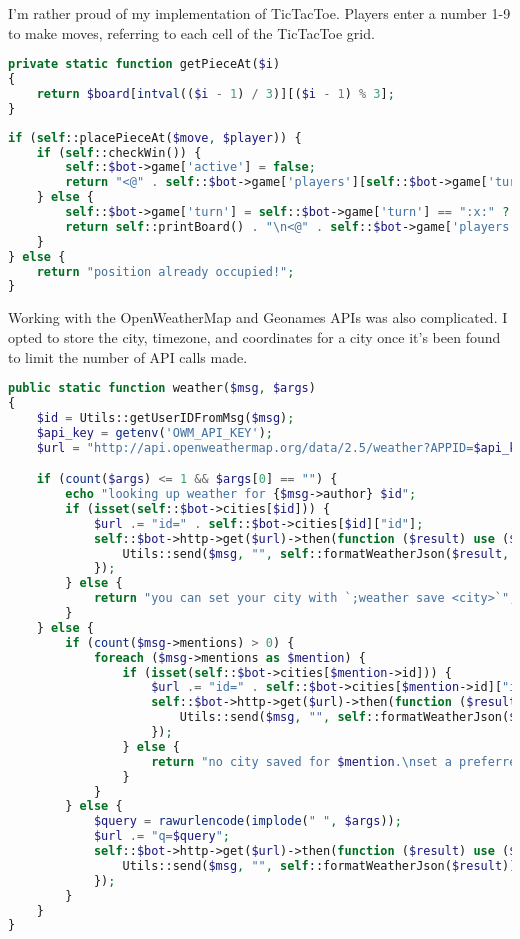 \documentclass[12pt]{article} %
\begin{document}
I'm rather proud of my implementation of TicTacToe. Players enter a number 1-9 to make moves, referring to each cell of the TicTacToe grid.


\begin{lstlisting}[language=PHP, caption=Get TicTacToe cell value]
private static function getPieceAt($i)
{
    return $board[intval(($i - 1) / 3)][($i - 1) % 3];
}
\end{lstlisting}

\begin{lstlisting}[language=PHP, caption=Handle a move from a player]
if (self::placePieceAt($move, $player)) {
    if (self::checkWin()) {
        self::$bot->game['active'] = false;
        return "<@" . self::$bot->game['players'][self::$bot->game['turn']] . "> won";
    } else {
        self::$bot->game['turn'] = self::$bot->game['turn'] == ":x:" ? ":o:" : ":x:";
        return self::printBoard() . "\n<@" . self::$bot->game['players'][self::$bot->game['turn']] . ">, it's your turn!";
    }
} else {
    return "position already occupied!";
}
\end{lstlisting}

Working with the OpenWeatherMap and Geonames APIs was also complicated. I opted to store the city, timezone, and coordinates for a city once it's been found to limit the number of API calls made.

\begin{lstlisting}[language=PHP, caption=Weather look up]
public static function weather($msg, $args)
{
    $id = Utils::getUserIDFromMsg($msg);
    $api_key = getenv('OWM_API_KEY');
    $url = "http://api.openweathermap.org/data/2.5/weather?APPID=$api_key&units=metric&";

    if (count($args) <= 1 && $args[0] == "") {
        echo "looking up weather for {$msg->author} $id";
        if (isset(self::$bot->cities[$id])) {
            $url .= "id=" . self::$bot->cities[$id]["id"];
            self::$bot->http->get($url)->then(function ($result) use ($msg, $city) {
                Utils::send($msg, "", self::formatWeatherJson($result, $city["timezone"]));
            });
        } else {
            return "you can set your city with `;weather save <city>`";
        }
    } else {
        if (count($msg->mentions) > 0) {
            foreach ($msg->mentions as $mention) {
                if (isset(self::$bot->cities[$mention->id])) {
                    $url .= "id=" . self::$bot->cities[$mention->id]["id"];
                    self::$bot->http->get($url)->then(function ($result) use ($msg, $city) {
                        Utils::send($msg, "", self::formatWeatherJson($result, $city["timezone"]));
                    });
                } else {
                    return "no city saved for $mention.\nset a preferred city with `;weather save <city> $mention`";
                }
            }
        } else {
            $query = rawurlencode(implode(" ", $args));
            $url .= "q=$query";
            self::$bot->http->get($url)->then(function ($result) use ($msg) {
                Utils::send($msg, "", self::formatWeatherJson($result));
            });
        }
    }
}
\end{lstlisting}
\end{document}
